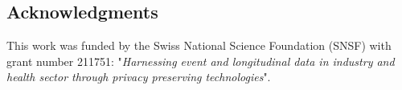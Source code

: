 \documentclass[a0,portrait]{a0poster}
\begin{document}
\begin{multicols}{3}
\subsection{\textsuperscript{}Acknowledgments}
\label{Acknowledgments}

\normalsize
This work was funded by the Swiss National Science Foundation (SNSF) with grant number 211751: "\textit{Harnessing event and longitudinal data in industry and health sector through privacy preserving technologies}".










 
\end{multicols}
\end{document}
